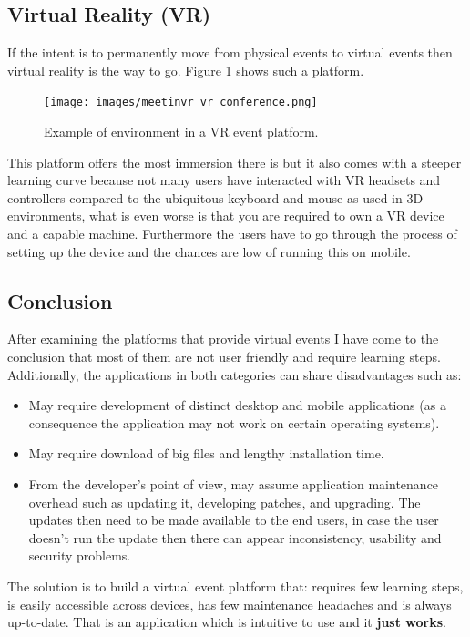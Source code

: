 \subsection*{Virtual Reality (VR)}
If the intent is to permanently move from physical events to virtual events then virtual reality is the way to go. Figure \ref{figure:motivation-vr} shows such a platform.

\begin{figure}[H]
	\texttt{[image: images/meetinvr\_vr\_conference.png]}
	\caption{Example of environment in a VR event platform.}
	\label{figure:motivation-vr}
\end{figure}

This platform offers the most immersion there is but it also comes with a steeper learning curve because not many users have interacted with VR headsets and controllers compared to the ubiquitous keyboard and mouse as used in 3D environments, what is even worse is that you are required to own a VR device and a capable machine. Furthermore the users have to go through the process of setting up the device and the chances are low of running this on mobile. \\

\subsection*{Conclusion}
After examining the platforms that provide virtual events I have come to the conclusion that most of them are not user friendly and require learning steps. Additionally, the applications in both categories can share disadvantages such as:
\begin{itemize}
    \item May require development of distinct desktop and mobile applications (as a consequence the application may not work on certain operating systems).
    \item May require download of big files and lengthy installation time.
    \item From the developer's point of view, may assume application maintenance overhead such as updating it, developing patches, and upgrading. The updates then need to be made available to the end users, in case the user doesn't run the update then there can appear inconsistency, usability and security problems.
\end{itemize}

The solution is to build a virtual event platform that: requires few learning steps,	 is easily accessible across devices, has few maintenance headaches and is always up-to-date. That is an application which is intuitive to use and it \textbf{just works}.

